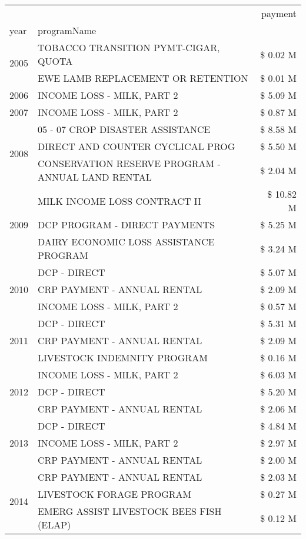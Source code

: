 \begin{tabular}{llr}
\toprule
 &  & payment \\
year & programName &  \\
\midrule
\multirow[t]{2}{*}{2005} & TOBACCO TRANSITION PYMT-CIGAR, QUOTA & \$ 0.02 M \\
 & EWE LAMB REPLACEMENT OR RETENTION & \$ 0.01 M \\
\cline{1-3}
2006 & INCOME LOSS - MILK, PART 2 & \$ 5.09 M \\
\cline{1-3}
2007 & INCOME LOSS - MILK, PART 2 & \$ 0.87 M \\
\cline{1-3}
\multirow[t]{3}{*}{2008} & 05 - 07 CROP DISASTER ASSISTANCE & \$ 8.58 M \\
 & DIRECT AND COUNTER CYCLICAL PROG & \$ 5.50 M \\
 & CONSERVATION RESERVE PROGRAM - ANNUAL LAND RENTAL & \$ 2.04 M \\
\cline{1-3}
\multirow[t]{3}{*}{2009} & MILK INCOME LOSS CONTRACT II & \$ 10.82 M \\
 & DCP PROGRAM - DIRECT PAYMENTS & \$ 5.25 M \\
 & DAIRY ECONOMIC LOSS ASSISTANCE PROGRAM & \$ 3.24 M \\
\cline{1-3}
\multirow[t]{3}{*}{2010} & DCP - DIRECT & \$ 5.07 M \\
 & CRP PAYMENT - ANNUAL RENTAL & \$ 2.09 M \\
 & INCOME LOSS - MILK, PART 2 & \$ 0.57 M \\
\cline{1-3}
\multirow[t]{3}{*}{2011} & DCP - DIRECT & \$ 5.31 M \\
 & CRP PAYMENT - ANNUAL RENTAL & \$ 2.09 M \\
 & LIVESTOCK INDEMNITY PROGRAM & \$ 0.16 M \\
\cline{1-3}
\multirow[t]{3}{*}{2012} & INCOME LOSS - MILK, PART 2 & \$ 6.03 M \\
 & DCP - DIRECT & \$ 5.20 M \\
 & CRP PAYMENT - ANNUAL RENTAL & \$ 2.06 M \\
\cline{1-3}
\multirow[t]{3}{*}{2013} & DCP - DIRECT & \$ 4.84 M \\
 & INCOME LOSS - MILK, PART 2 & \$ 2.97 M \\
 & CRP PAYMENT - ANNUAL RENTAL & \$ 2.00 M \\
\cline{1-3}
\multirow[t]{3}{*}{2014} & CRP PAYMENT - ANNUAL RENTAL & \$ 2.03 M \\
 & LIVESTOCK FORAGE PROGRAM & \$ 0.27 M \\
 & EMERG ASSIST LIVESTOCK BEES FISH (ELAP) & \$ 0.12 M \\

\end{tabular}
